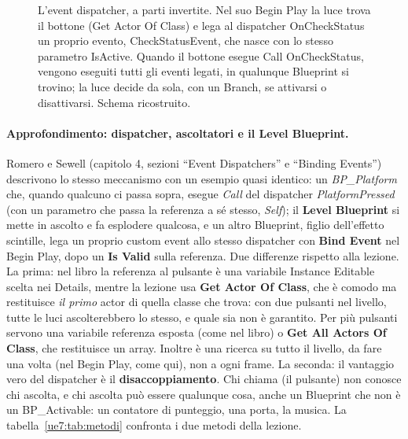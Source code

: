 \begin{figure}[htbp]
\caption{L'event dispatcher, a parti invertite. Nel suo Begin Play la luce trova il
bottone (Get Actor Of Class) e lega al dispatcher OnCheckStatus un proprio evento,
CheckStatusEvent, che nasce con lo stesso parametro IsActive. Quando il bottone esegue
Call OnCheckStatus, vengono eseguiti tutti gli eventi legati, in qualunque Blueprint si
trovino; la luce decide da sola, con un Branch, se attivarsi o disattivarsi. Schema
ricostruito.}
\label{ue7:fig:dispatcher}
\end{figure}

\paragraph{Approfondimento: dispatcher, ascoltatori e il Level Blueprint.} Romero e
Sewell (capitolo 4, sezioni ``Event Dispatchers'' e ``Binding Events'') descrivono lo
stesso meccanismo con un esempio quasi identico: un \emph{BP\_Platform} che, quando
qualcuno ci passa sopra, esegue \emph{Call} del dispatcher \emph{PlatformPressed}
(con un parametro che passa la referenza a sé stesso, \emph{Self}); il \textbf{Level
Blueprint} si mette in ascolto e fa esplodere qualcosa, e un altro Blueprint, figlio
dell'effetto scintille, lega un proprio custom event allo stesso dispatcher con
\textbf{Bind Event} nel Begin Play, dopo un \textbf{Is Valid} sulla referenza. Due
differenze rispetto alla lezione. La prima: nel libro la referenza al pulsante è una
variabile Instance Editable scelta nei Details, mentre la lezione usa \textbf{Get Actor
Of Class}, che è comodo ma restituisce \emph{il primo} actor di quella classe che trova:
con due pulsanti nel livello, tutte le luci ascolterebbero lo stesso, e quale sia non è
garantito. Per più pulsanti servono una variabile referenza esposta (come nel libro) o
\textbf{Get All Actors Of Class}, che restituisce un array. Inoltre è una ricerca su
tutto il livello, da fare una volta (nel Begin Play, come qui), non a ogni frame. La
seconda: il vantaggio vero del dispatcher è il \textbf{disaccoppiamento}. Chi chiama
(il pulsante) non conosce chi ascolta, e chi ascolta può essere qualunque cosa, anche
un Blueprint che non è un BP\_Activable: un contatore di punteggio, una porta, la musica.
La tabella~\ref{ue7:tab:metodi} confronta i due metodi della lezione.


